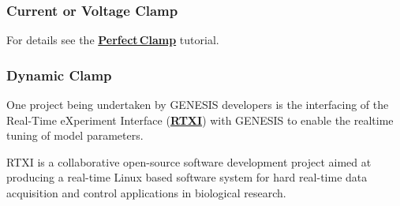 \documentclass[12pt]{article}
\begin{document}
\subsubsection*{Current or Voltage Clamp}

For details see the \href{../pclamp/pclamp.tex}{\bf Perfect\,Clamp} tutorial.

\subsubsection*{Dynamic Clamp}

One project being undertaken by GENESIS developers is the interfacing of the Real-Time eXperiment Interface (\href{http://www.rtxi.org/}{\bf RTXI}) with GENESIS to enable the realtime tuning of model parameters.

RTXI is a collaborative open-source software development project aimed at producing a real-time Linux based software system for hard real-time data acquisition and control applications in biological research. \\
\end{document}

